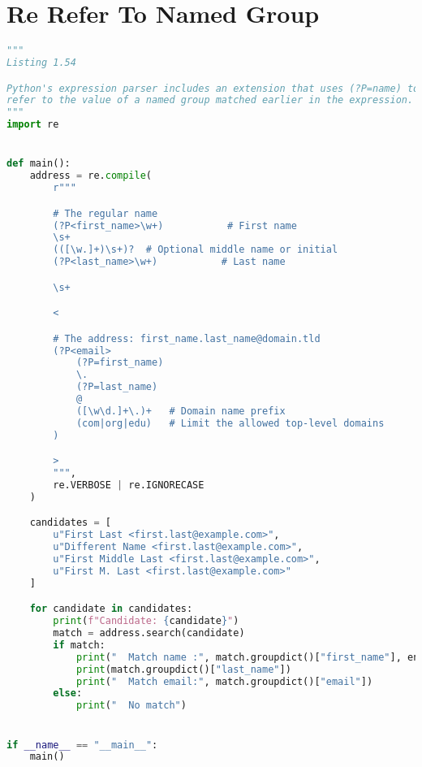 \documentclass[a4paper,landscape]{report}
\begin{document}
\section{Re Refer To Named Group}
\begin{lstlisting}[language=Python]
"""
Listing 1.54

Python's expression parser includes an extension that uses (?P=name) to
refer to the value of a named group matched earlier in the expression.
"""
import re


def main():
    address = re.compile(
        r"""

        # The regular name
        (?P<first_name>\w+)           # First name
        \s+
        (([\w.]+)\s+)?  # Optional middle name or initial
        (?P<last_name>\w+)           # Last name

        \s+

        <

        # The address: first_name.last_name@domain.tld
        (?P<email>
            (?P=first_name)
            \.
            (?P=last_name)
            @
            ([\w\d.]+\.)+   # Domain name prefix
            (com|org|edu)   # Limit the allowed top-level domains
        )

        >
        """,
        re.VERBOSE | re.IGNORECASE
    )

    candidates = [
        u"First Last <first.last@example.com>",
        u"Different Name <first.last@example.com>",
        u"First Middle Last <first.last@example.com>",
        u"First M. Last <first.last@example.com>"
    ]

    for candidate in candidates:
        print(f"Candidate: {candidate}")
        match = address.search(candidate)
        if match:
            print("  Match name :", match.groupdict()["first_name"], end=" ")
            print(match.groupdict()["last_name"])
            print("  Match email:", match.groupdict()["email"])
        else:
            print("  No match")


if __name__ == "__main__":
    main()

\end{lstlisting}
\end{document}
